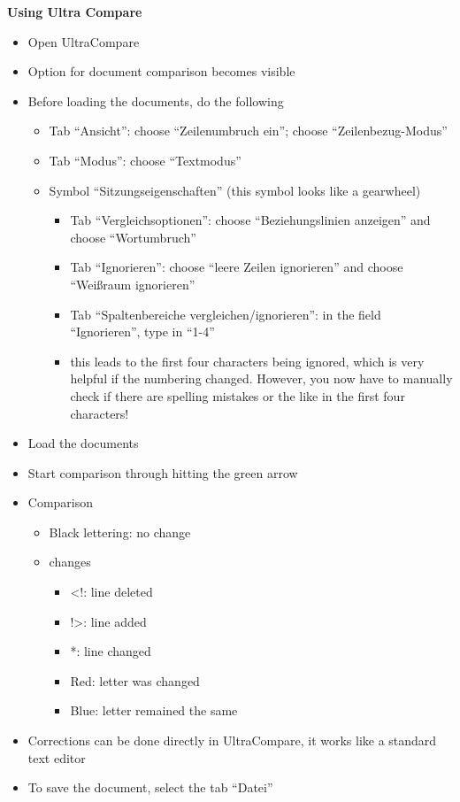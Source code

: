 \documentclass[10pt,]{article}
\providecommand{\tightlist}{%
  \setlength{\itemsep}{0pt}\setlength{\parskip}{0pt}}
\begin{document}
\textbf{Using Ultra Compare}

\begin{itemize}
\tightlist
\item
  Open UltraCompare
\item
  Option for document comparison becomes visible
\item
  Before loading the documents, do the following

  \begin{itemize}
  \tightlist
  \item
    Tab ``Ansicht'': choose ``Zeilenumbruch ein''; choose
    ``Zeilenbezug-Modus''
  \item
    Tab ``Modus'': choose ``Textmodus''
  \item
    Symbol ``Sitzungseigenschaften'' (this symbol looks like a
    gearwheel)

    \begin{itemize}
    \tightlist
    \item
      Tab ``Vergleichsoptionen'': choose ``Beziehungslinien anzeigen''
      and choose ``Wortumbruch''
    \item
      Tab ``Ignorieren'': choose ``leere Zeilen ignorieren'' and choose
      ``Weißraum ignorieren''
    \item
      Tab ``Spaltenbereiche vergleichen/ignorieren'': in the field
      ``Ignorieren'', type in ``1-4''
    \item
      this leads to the first four characters being ignored, which is
      very helpful if the numbering changed. However, you now have to
      manually check if there are spelling mistakes or the like in the
      first four characters!
    \end{itemize}
  \end{itemize}
\item
  Load the documents
\item
  Start comparison through hitting the green arrow
\item
  Comparison

  \begin{itemize}
  \tightlist
  \item
    Black lettering: no change
  \item
    changes

    \begin{itemize}
    \tightlist
    \item
      \textless{}!: line deleted
    \item
      !\textgreater{}: line added
    \item
      *: line changed
    \item
      Red: letter was changed
    \item
      Blue: letter remained the same
    \end{itemize}
  \end{itemize}
\item
  Corrections can be done directly in UltraCompare, it works like a
  standard text editor
\item
  To save the document, select the tab ``Datei''


\end{itemize}
\end{document}
